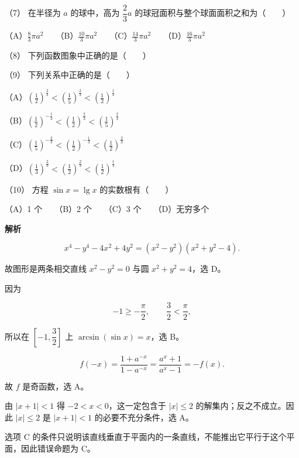 \begin{answer}
（7） 在半径为 $a$ 的球中，高为 $\dfrac23a$ 的球冠面积与整个球面面积之和为\mbox{（　　）}

（A）$\frac83\pi a^2$　　（B）$\frac{10}3\pi a^2$　　（C）$\frac{14}3\pi a^2$　　（D）$\frac{16}3\pi a^2$

（8） 下列函数图象中正确的是\mbox{（　　）}
\nopagebreak[4]
\begin{center}\end{center}
\nopagebreak[4]
（9） 下列关系中正确的是\mbox{（　　）}

（A）$\left(\frac12\right)^{\frac23}<\left(\frac15\right)^{\frac23}<\left(\frac12\right)^{\frac13}$

（B）$\left(\frac12\right)^{-\frac13}<\left(\frac12\right)^{\frac23}<\left(\frac15\right)^{\frac23}$

（C）$\left(\frac15\right)^{-\frac23}<\left(\frac12\right)^{-\frac13}<\left(\frac12\right)^{\frac23}$

（D）$\left(\frac13\right)^{\frac23}<\left(\frac12\right)^{\frac23}<\left(\frac12\right)^{\frac13}$

（10） 方程 $\sin x=\lg x$ 的实数根有\mbox{（　　）}

（A）1 个　　（B）2 个　　（C）3 个　　（D）无穷多个

\textbf{解析}


\nopagebreak[4]
\[
x^4-y^4-4x^2+4y^2
=(x^2-y^2)(x^2+y^2-4).
\]

故图形是两条相交直线 $x^2-y^2=0$ 与圆 $x^2+y^2=4$，选 D。


因为

\nopagebreak[4]
\[
-1\ge-\frac\pi2,\qquad \frac32<\frac\pi2,
\]

所以在 $\left[-1,\dfrac32\right]$ 上 $\arcsin(\sin x)=x$，选 B。


\nopagebreak[4]
\[
f(-x)=\frac{1+a^{-x}}{1-a^{-x}}
=\frac{a^x+1}{a^x-1}
=-f(x).
\]

故 $f$ 是奇函数，选 A。


由 $|x+1|<1$ 得 $-2<x<0$，这一定包含于 $|x|\le2$ 的解集内；反之不成立。因此 $|x|\le2$ 是 $|x+1|<1$ 的必要不充分条件，选 A。


选项 C 的条件只说明该直线垂直于平面内的一条直线，不能推出它平行于这个平面，因此错误命题为 C。


\end{answer}
